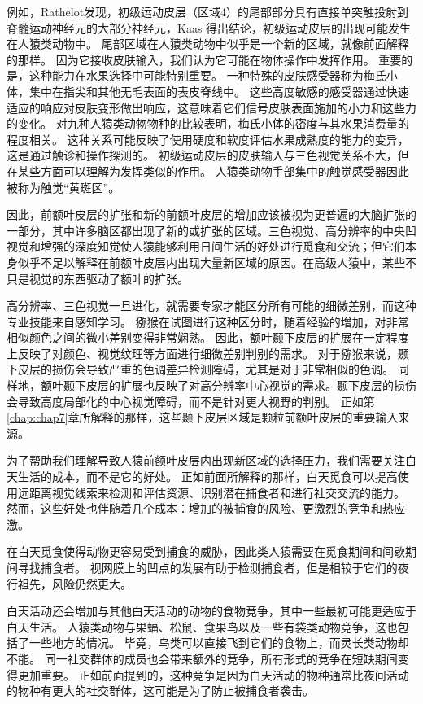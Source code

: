 例如，Rathelot\cite{rathelot2009subdivisions}发现，初级运动皮层（区域4）的尾部部分具有直接单突触投射到脊髓运动神经元的大部分神经元，Kaas 得出结论，初级运动皮层的出现可能发生在人猿类动物中\cite{kaas2004evolution}。
尾部区域在人猿类动物中似乎是一个新的区域，就像前面解释的那样。
因为它接收皮肤输入\cite{strick1978sorting,tanji2008role}，我们认为它可能在物体操作中发挥作用。
重要的是，这种能力在水果选择中可能特别重要。
一种特殊的皮肤感受器称为梅氏小体，集中在指尖和其他无毛表面的表皮脊线中。
这些高度敏感的感受器通过快速适应的响应对皮肤变形做出响应，这意味着它们信号皮肤表面施加的小力和这些力的变化。
对九种人猿类动物物种的比较表明，梅氏小体的密度与其水果消费量的程度相关。
这种关系可能反映了使用硬度和软度评估水果成熟度的能力的变异，这是通过触诊和操作探测的\cite{hoffmann2004meissner}。
初级运动皮层的皮肤输入与三色视觉关系不大，但在某些方面可以理解为发挥类似的作用。
人猿类动物手部集中的触觉感受器因此被称为触觉“黄斑区”。


因此，前额叶皮层的扩张和新的前额叶皮层的增加应该被视为更普遍的大脑扩张的一部分，其中许多脑区都出现了新的或扩张的区域。三色视觉、高分辨率的中央凹视觉和增强的深度知觉使人猿能够利用日间生活的好处进行觅食和交流；但它们本身似乎不足以解释在前额叶皮层内出现大量新区域的原因。在高级人猿中，某些不只是视觉的东西驱动了额叶的扩张。

高分辨率、三色视觉一旦进化，就需要专家才能区分所有可能的细微差别，而这种专业技能来自感知学习。
猕猴在试图进行这种区分时，随着经验的增加，对非常相似颜色之间的微小差别变得非常娴熟\cite{gaffan1996associative}。
因此，额叶颞下皮层的扩展在一定程度上反映了对颜色、视觉纹理等方面进行细微差别判别的需求。
对于猕猴来说，颞下皮层的损伤会导致严重的色调差异检测障碍，尤其是对于非常相似的色调\cite{huxlin2000perceptual}。
同样地，额叶颞下皮层的扩展也反映了对高分辨率中心视觉的需求。颞下皮层的损伤会导致高度局部化的中心视觉障碍，而不是针对更大视野的判别\cite{horel1994local}。
正如第\ref{chap:chap7}章所解释的那样，这些颞下皮层区域是颗粒前额叶皮层的重要输入来源。


为了帮助我们理解导致人猿前额叶皮层内出现新区域的选择压力，我们需要关注白天生活的成本，而不是它的好处。
正如前面所解释的那样，白天觅食可以提高使用远距离视觉线索来检测和评估资源、识别潜在捕食者和进行社交交流的能力。
然而，这些好处也伴随着几个成本：增加的被捕食的风险、更激烈的竞争和热应激。


在白天觅食使得动物更容易受到捕食的威胁，因此类人猿需要在觅食期间和间歇期间寻找捕食者。
视网膜上的凹点的发展有助于检测捕食者，但是相较于它们的夜行祖先，风险仍然更大。


白天活动还会增加与其他白天活动的动物的食物竞争，其中一些最初可能更适应于白天生活。
人猿类动物与果蝠、松鼠、食果鸟以及一些有袋类动物竞争，这也包括了一些地方的情况\cite{jf1987food}。
毕竟，鸟类可以直接飞到它们的食物上，而灵长类动物却不能。
同一社交群体的成员也会带来额外的竞争，所有形式的竞争在短缺期间变得更加重要。
正如前面提到的，这种竞争是因为白天活动的物种通常比夜间活动的物种有更大的社交群体，这可能是为了防止被捕食者袭击。



